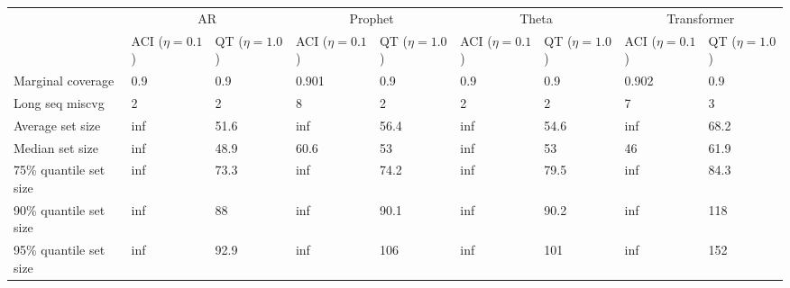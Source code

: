 \begin{tabular}{lllllllll}
\toprule
& \multicolumn{2}{c}{AR}& \multicolumn{2}{c}{Prophet}& \multicolumn{2}{c}{Theta}& \multicolumn{2}{c}{Transformer} \\
& ACI ($\eta=0.1$) & QT ($\eta=1.0$) & ACI ($\eta=0.1$) & QT ($\eta=1.0$) & ACI ($\eta=0.1$) & QT ($\eta=1.0$) & ACI ($\eta=0.1$) & QT ($\eta=1.0$) \\
\midrule
Marginal coverage & 0.9 & 0.9 & 0.901 & 0.9 & 0.9 & 0.9 & 0.902 & 0.9 \\
Long seq miscvg & 2 & 2 & 8 & 2 & 2 & 2 & 7 & 3 \\
Average set size & inf & 51.6 & inf & 56.4 & inf & 54.6 & inf & 68.2 \\
Median set size & inf & 48.9 & 60.6 & 53 & inf & 53 & 46 & 61.9 \\
75\% quantile set size & inf & 73.3 & inf & 74.2 & inf & 79.5 & inf & 84.3 \\
90\% quantile set size & inf & 88 & inf & 90.1 & inf & 90.2 & inf & 118 \\
95\% quantile set size & inf & 92.9 & inf & 106 & inf & 101 & inf & 152 \\
\bottomrule
\end{tabular}

